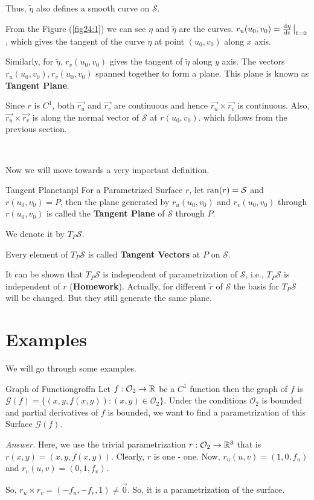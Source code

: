 \documentclass[../Analysis-3.tex]{subfiles}
\begin{document}
Thus, $\tilde{\eta}$ also defines a smooth curve on $\mathcal{S}$.

From the Figure (\ref{fig24:1}) we can see $\eta$ and $\tilde{\eta}$ are the curves. $r_u(u_0,v_0)=\dv{\eta}{t}\eval_{t=0}$, which gives the tangent of the curve $\eta$ at point $(u_0,v_0)$ along $x$ axis.

Similarly, for $\tilde{\eta}$, $r_v(u_0,v_0)$  gives the tangent of $\tilde{\eta}$ along $y$ axis. The vectors $r_u(u_0,v_0),r_v(u_0,v_0)$ spanned together to form a plane. This plane is known as \textbf{Tangent Plane}.

Since $r$ is $C^1$, both $\vec{r_u}$ and $\vec{r_v}$ are continuous and hence $\vec{r_u} \times \vec{r_v}$ is continuous. Also, $\vec{r_u} \times \vec{r_v}$ is along the normal vector of $\mathcal{S}$ at $r(u_0,v_0)$. which follows from the previous section.

\

Now we will move towards a very important definition.

\begin{Def}{Tangent Plane}{tanpl}
  For a Parametrized Surface $r$, let $\operatorname{ran}(r)=\mathcal{S}$ and $r(u_0,v_0)=P$, then the plane generated by $r_u(u_0,v_0)$ and $r_v(u_0,v_0)$ through $r(u_0,v_0)$ is called the \textbf{Tangent Plane} of $\mathcal{S}$ through $P$.

  We denote it by $T_P\mathcal{S}$.

  Every element of $T_P\mathcal{S}$ is called \textbf{Tangent Vectors} at $P$ on $\mathcal{S}$.
\end{Def}

It can be shown that $T_P\mathcal{S}$ is independent of parametrization of $\mathcal{S}$, i.e., $T_P\mathcal{S}$ is independent of $r$ (\textbf{Homework}). Actually, for different $\tilde{r}$ of $\mathcal{S}$ the basis for $T_P\mathcal{S}$ will be changed. But they still generate the same plane.

\section{Examples}

We will go through some examples.

\begin{Eg}{Graph of Function}{groffn}
  Let $f : \mathcal{O}_2 \to \mathbb{R}$ be a $C^1$ function then the graph of $f$ is $\mathcal{G}(f) = \{ (x,y,f(x,y)) : (x,y)\in \mathcal{O}_2\}$. Under the conditions $\mathcal{O}_2$ is bounded and partial derivatives of $f$ is bounded, we want to find a parametrization of this Surface $\mathcal{G}(f)$.

  \textit{Answer.} Here, we use the trivial parametrization $r : \mathcal{O}_2 \to \mathbb{R}^3$ that is $ r(x,y) = (x,y,f(x,y))$. Clearly, $r$ is one - one. Now, $r_u(u,v) = (1,0,f_u)$ and $r_v(u,v) = (0,1,f_v)$.

  So, $ r_u \times r_v = (-f_u,-f_v,1) \neq \vec{0}$. So, it is a parametrization of the surface.
\end{Eg}
\end{document}
